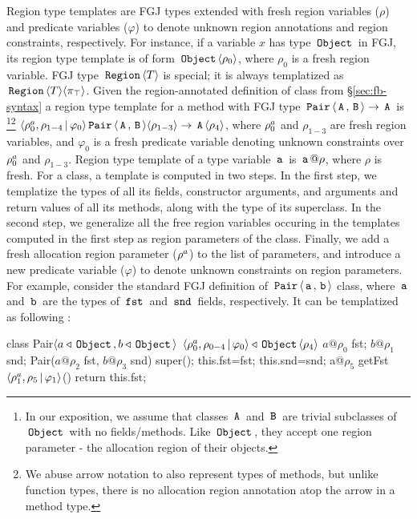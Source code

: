Region type templates are FGJ types extended with fresh region
variables ($\rho$) and predicate variables ($\varphi$) to denote
unknown region annotations and region constraints, respectively. For
instance, if a variable $x$ has type $\,{\tt Object}\,$ in FGJ, its region type
template is of form $\,{\tt Object}\,\langle \rho_0 \rangle$, where $\rho_0$ is a fresh
region variable. FGJ type $\,{\tt Region}\,\langle T \rangle$ is special; it is
always templatized as $\,{\tt Region}\,{\langle T \rangle}\langle \pi_{\top} \rangle$. Given the
region-annotated definition of  class from
\S\ref{sec:fb-syntax} a region type template for a method with FGJ
type $\,{\tt Pair}\,\langle \,{\tt A}\,,\,{\tt B}\, \rangle \rightarrow \,{\tt A}\,$ is \footnote{In
our exposition, we assume that classes $\,{\tt A}\,$ and $\,{\tt B}\,$ are trivial
subclasses of $\,{\tt Object}\,$ with no fields/methods. Like $\,{\tt Object}\,$, they
accept one region parameter - the allocation region of their
objects.}\footnote{We abuse arrow notation to also represent types of
methods, but unlike function types, there is no allocation region
annotation atop the arrow in a method type.}
$\langle \rho^a_0,\rho_{1-4} \,|\, \varphi_0 \rangle
\,{\tt Pair}\,\langle \,{\tt A}\,,\,{\tt B}\, \rangle \langle \rho_{1-3} \rangle \rightarrow
\,{\tt A}\,\langle \rho_4 \rangle$, where $\rho^a_0$ and $\rho_{1-3}$ are fresh
region variables, and $\varphi_0$ is a fresh predicate variable
denoting unknown constraints over $\rho^a_0$ and $\rho_{1-3}$.
Region type template of a type variable $\,{\tt a}\,$ is $\,{\tt a}\,@\rho$, where
$\rho$ is fresh. For a class, a template is computed in two steps. In
the first step, we templatize the types of all its fields, constructor
arguments, and arguments and return values of all its methods, along
with the type of its superclass. In the second step, we generalize all
the free region variables occuring in the templates computed in the
first step as region parameters of the class. Finally, we add a fresh
allocation region parameter ($\rho^a$) to the list of parameters,
and introduce a new predicate variable ($\varphi$) to denote unknown
constraints on region parameters. For example, consider the standard
FGJ definition of $\,{\tt Pair}\,\langle \,{\tt a}\,,\,{\tt b}\, \rangle$ class, where $\,{\tt a}\,$
and $\,{\tt b}\,$ are the types of $\,{\tt fst}\,$ and $\,{\tt snd}\,$ fields,
respectively. It can be templatized as following :
\vspace*{-0.1in}
\begin{center}
\begin{codejava}
class Pair$\langle a\triangleleft\,{\tt Object}\,, b\triangleleft\,{\tt Object}\, \rangle$
          $\langle \rho^a_0,\rho_{0-4}\,|\,\varphi_0 \rangle \triangleleft \,{\tt Object}\,\langle \rho_4 \rangle$ {
  $a@\rho_0$ fst; $b@\rho_1$ snd;
  Pair($a@\rho_2$ fst, $b@\rho_3$ snd) { 
    super(); this.fst=fst; this.snd=snd; 
  }
  a@$\rho_5$ getFst$\langle \rho^a_1,\rho_5\,|\,\varphi_1 \rangle$() { return this.fst; }
}
\end{codejava}
\end{center}
